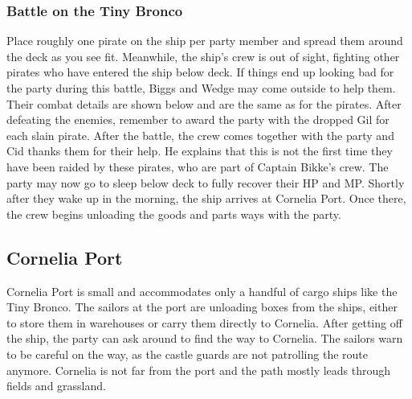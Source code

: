 \subsubsection*{Battle on the Tiny Bronco}  
Place roughly one pirate on the ship per party member and spread them around the deck as you see fit.
Meanwhile, the ship's crew is out of sight, fighting other pirates who have entered the ship below deck.
If things end up looking bad for the party during this battle, Biggs and Wedge may come outside to help them.
Their combat details are shown below and are the same as for the pirates.
After defeating the enemies, remember to award the party with the dropped Gil for each slain pirate.
After the battle, the crew comes together with the party and Cid thanks them for their help.
He explains that this is not the first time they have been raided by these pirates, who are part of Captain Bikke's crew.
The party may now go to sleep below deck to fully recover their HP and MP.
Shortly after they wake up in the morning, the ship arrives at Cornelia Port. 
Once there, the crew begins unloading the goods and parts ways with the party.
\vspace{0.5cm}

\vspace{0.8cm}
\subsection*{Cornelia Port}
Cornelia Port is small and accommodates only a handful of cargo ships like the Tiny Bronco.
The sailors at the port are unloading boxes from the ships, either to store them in warehouses or carry them directly to Cornelia.
After getting off the ship, the party can ask around to find the way to Cornelia.
The sailors warn to be careful on the way, as the castle guards are not patrolling the route anymore.
Cornelia is not far from the port and the path mostly leads through fields and grassland.
 
